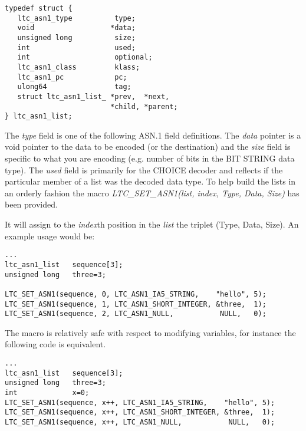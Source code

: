 \documentclass[synpaper]{book}
\begin{document}
\begin{verbatim}
typedef struct {
   ltc_asn1_type          type;
   void                  *data;
   unsigned long          size;
   int                    used;
   int                    optional;
   ltc_asn1_class         klass;
   ltc_asn1_pc            pc;
   ulong64                tag;
   struct ltc_asn1_list_ *prev,  *next,
                         *child, *parent;
} ltc_asn1_list;
\end{verbatim}

The \textit{type} field is one of the following ASN.1 field definitions.  The \textit{data} pointer is a void pointer to the data to be encoded (or the destination) and the
\textit{size} field is specific to what you are encoding (e.g. number of bits in the BIT STRING data type).  The \textit{used} field is primarily for the CHOICE decoder
and reflects if the particular member of a list was the decoded data type.  To help build the lists in an orderly fashion the macro
\textit{LTC\_SET\_ASN1(list, index, Type, Data, Size)} has been provided.

It will assign to the \textit{index}th position in the \textit{list} the triplet (Type, Data, Size).  An example usage would be:

\begin{small}
\begin{verbatim}
...
ltc_asn1_list   sequence[3];
unsigned long   three=3;

LTC_SET_ASN1(sequence, 0, LTC_ASN1_IA5_STRING,    "hello", 5);
LTC_SET_ASN1(sequence, 1, LTC_ASN1_SHORT_INTEGER, &three,  1);
LTC_SET_ASN1(sequence, 2, LTC_ASN1_NULL,           NULL,   0);
\end{verbatim}
\end{small}

The macro is relatively safe with respect to modifying variables, for instance the following code is equivalent.

\begin{small}
\begin{verbatim}
...
ltc_asn1_list   sequence[3];
unsigned long   three=3;
int             x=0;
LTC_SET_ASN1(sequence, x++, LTC_ASN1_IA5_STRING,    "hello", 5);
LTC_SET_ASN1(sequence, x++, LTC_ASN1_SHORT_INTEGER, &three,  1);
LTC_SET_ASN1(sequence, x++, LTC_ASN1_NULL,           NULL,   0);
\end{verbatim}
\end{small}
\end{document}
